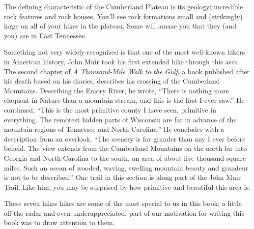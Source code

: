 \documentclass[
  letterpaper,
  DIV=11,
  numbers=noendperiod]{scrreprt}
\begin{document}
The defining characteristic of the Cumberland Plateau is its geology:
incredible rock features and rock houses. You'll see rock formations
small and (strikingly) large on all of your hikes in the plateau. Some
will amaze you that they (and you) are in East Tennessee.

Something not very widely-recognized is that one of the most well-known
hikers in American history, John Muir took his first extended hike
through this area. The second chapter of \emph{A Thousand-Mile Walk to
the Gulf}, a book published after his death based on his diaries,
describes his crossing of the Cumberland Mountains. Describing the Emory
River, he wrote, ``There is nothing more eloquent in Nature than a
mountain stream, and this is the first I ever saw.'' He continued,
``This is the most primitive county I have seen, primitive in
everything. The remotest hidden parts of Wisconsin are far in advance of
the mountain regions of Tennessee and North Carolina.'' He concludes
with a description from an overlook, ``The scenery is far grander than
any I ever before beheld. The view extends from the Cumberland Mountains
on the north far into Georgia and North Carolina to the south, an area
of about five thousand square miles. Such an ocean of wooded, waving,
swelling mountain beauty and grandeur is not to be described.'' One
trail in this section is along part of the John Muir Trail. Like him,
you may be surprised by how primitive and beautiful this area is.

These seven hikes hikes are some of the most special to us in this book;
a little off-the-radar and even underappreciated, part of our motivation
for writing this book was to draw attention to them.
\end{document}
